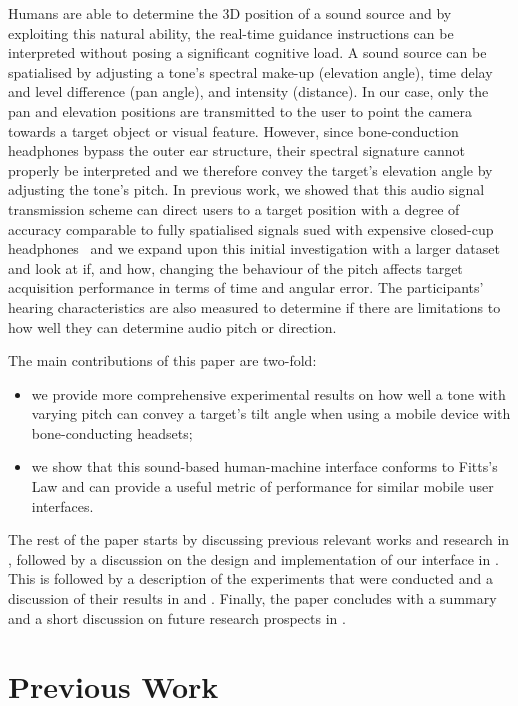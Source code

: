 \documentclass[]{interact}
\begin{document}
Humans are able to determine the 3D position of a sound source and by exploiting this natural ability, the real-time guidance instructions can be interpreted without posing a significant cognitive load.
A sound source can be spatialised by adjusting a tone's spectral make-up (elevation angle), time delay and level difference (pan angle), and intensity (distance).
In our case, only the pan and elevation positions are transmitted to the user to point the camera towards a target object or visual feature.
However, since bone-conduction headphones bypass the outer ear structure, their spectral signature cannot properly be interpreted and we therefore convey the target's elevation angle by adjusting the tone's pitch.
In previous work, we showed that this audio signal transmission scheme can direct users to a target position with a degree of accuracy comparable to fully spatialised signals sued with expensive closed-cup headphones~\citep{lock2019bone,macdonald2006spatial} and we expand upon this initial investigation with a larger dataset and look at if, and how, changing the behaviour of the pitch affects target acquisition performance in terms of time and angular error. 
The participants' hearing characteristics are also measured to determine if there are limitations to how well they can determine audio pitch or direction. 

The main contributions of this paper are two-fold: 

\begin{itemize}
  \item we provide more comprehensive experimental results on how well a tone with varying pitch can convey a target's tilt angle when using a mobile device with bone-conducting headsets; 
  \item we show that this sound-based human-machine interface conforms to Fitts's Law and can provide a useful metric of performance for similar mobile user interfaces.
\end{itemize}

The rest of the paper starts by discussing previous relevant works and research in , followed by a discussion on the design and implementation of our interface in .
This is followed by a description of the experiments that were conducted and a discussion of their results in  and .
Finally, the paper concludes with a summary and a short discussion on future research prospects in .

\section{Previous Work}\label{sec:prev-work}
\end{document}
